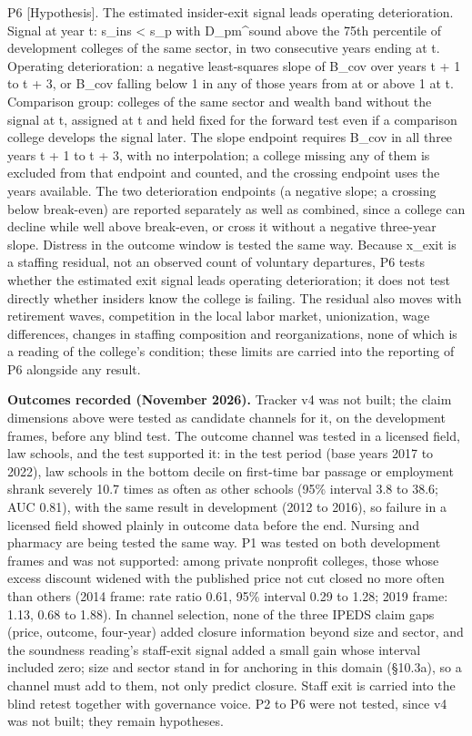 \documentclass[
]{article}
\begin{document}
P6 {[}Hypothesis{]}. The estimated insider-exit signal leads operating
deterioration. Signal at year t: s\_ins \textless{} s\_p with
D\_pm\^{}sound above the 75th percentile of development colleges of the
same sector, in two consecutive years ending at t. Operating
deterioration: a negative least-squares slope of B\_cov over years t + 1
to t + 3, or B\_cov falling below 1 in any of those years from at or
above 1 at t. Comparison group: colleges of the same sector and wealth
band without the signal at t, assigned at t and held fixed for the
forward test even if a comparison college develops the signal later. The
slope endpoint requires B\_cov in all three years t + 1 to t + 3, with
no interpolation; a college missing any of them is excluded from that
endpoint and counted, and the crossing endpoint uses the years
available. The two deterioration endpoints (a negative slope; a crossing
below break-even) are reported separately as well as combined, since a
college can decline while well above break-even, or cross it without a
negative three-year slope. Distress in the outcome window is tested the
same way. Because x\_exit is a staffing residual, not an observed count
of voluntary departures, P6 tests whether the estimated exit signal
leads operating deterioration; it does not test directly whether
insiders know the college is failing. The residual also moves with
retirement waves, competition in the local labor market, unionization,
wage differences, changes in staffing composition and reorganizations,
none of which is a reading of the college's condition; these limits are
carried into the reporting of P6 alongside any result.

\textbf{Outcomes recorded (November 2026).} Tracker v4 was not built;
the claim dimensions above were tested as candidate channels for it, on
the development frames, before any blind test. The outcome channel was
tested in a licensed field, law schools, and the test supported it: in
the test period (base years 2017 to 2022), law schools in the bottom
decile on first-time bar passage or employment shrank severely 10.7
times as often as other schools (95\% interval 3.8 to 38.6; AUC 0.81),
with the same result in development (2012 to 2016), so failure in a
licensed field showed plainly in outcome data before the end. Nursing
and pharmacy are being tested the same way. P1 was tested on both
development frames and was not supported: among private nonprofit
colleges, those whose excess discount widened with the published price
not cut closed no more often than others (2014 frame: rate ratio 0.61,
95\% interval 0.29 to 1.28; 2019 frame: 1.13, 0.68 to 1.88). In channel
selection, none of the three IPEDS claim gaps (price, outcome,
four-year) added closure information beyond size and sector, and the
soundness reading's staff-exit signal added a small gain whose interval
included zero; size and sector stand in for anchoring in this domain
(§10.3a), so a channel must add to them, not only predict closure. Staff
exit is carried into the blind retest together with governance voice. P2
to P6 were not tested, since v4 was not built; they remain hypotheses.
\end{document}
